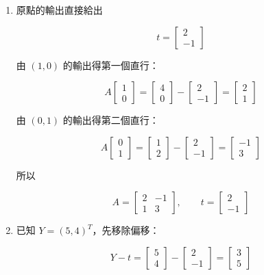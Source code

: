 \documentclass[11pt,a4paper]{article}
\begin{document}
\begin{enumerate}
\def\labelenumi{\arabic{enumi}.}
\item
  原點的輸出直接給出

  \[
  t=\begin{bmatrix}2\\-1\end{bmatrix}
  \]

  由 \((1,0)\) 的輸出得第一個直行：

  \[
  A\begin{bmatrix}1\\0\end{bmatrix}
  =\begin{bmatrix}4\\0\end{bmatrix}
  -\begin{bmatrix}2\\-1\end{bmatrix}
  =\begin{bmatrix}2\\1\end{bmatrix}
  \]

  由 \((0,1)\) 的輸出得第二個直行：

  \[
  A\begin{bmatrix}0\\1\end{bmatrix}
  =\begin{bmatrix}1\\2\end{bmatrix}
  -\begin{bmatrix}2\\-1\end{bmatrix}
  =\begin{bmatrix}-1\\3\end{bmatrix}
  \]

  所以

  \[
  A=\begin{bmatrix}2&-1\\1&3\end{bmatrix},
  \qquad
  t=\begin{bmatrix}2\\-1\end{bmatrix}
  \]
\item
  已知 \(Y=(5,4)^T\)，先移除偏移：

  \[
  Y-t=\begin{bmatrix}5\\4\end{bmatrix}
  -\begin{bmatrix}2\\-1\end{bmatrix}
  =\begin{bmatrix}3\\5\end{bmatrix}
  \]


\end{enumerate}
\end{document}
